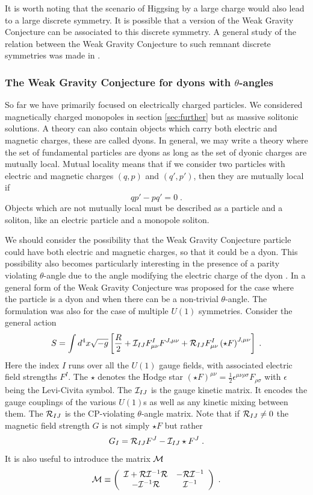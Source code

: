 \documentclass[11pt,a4paper]{article}
\numberwithin{equation}{section}
\numberwithin{table}{section}\setlength{\multlinegap}{25pt}
\newcommand{\be}{\begin{equation}}
\newcommand{\ee}{\end{equation}}
\begin{document}
It is worth noting that the scenario of Higgsing by a large charge would also lead to a large discrete symmetry. It is possible that a version of the Weak Gravity Conjecture can be associated to this discrete symmetry. A general study of the relation between the Weak Gravity Conjecture to such remnant discrete symmetries was made in \cite{Craig:2018yvw}.

\subsubsection{The Weak Gravity Conjecture for dyons with $\theta$-angles}
\label{sec:wgcta}

So far we have primarily focused on electrically charged particles. We considered magnetically charged monopoles in section \ref{sec:further} but as massive solitonic solutions. A theory can also contain objects which carry both electric and magnetic charges, these are called dyons. In general, we may write a theory where the set of fundamental particles are dyons as long as the set of dyonic charges are mutually local. Mutual locality means that if we consider two particles with electric and magnetic charges $\left(q,p\right)$ and $\left(q',p'\right)$, then they are mutually local if
\be
\label{ml}
q p' - p q' = 0 \;.
\ee
Objects which are not mutually local must be described as a particle and a soliton, like an electric particle and a monopole soliton. 

We should consider the possibility that the Weak Gravity Conjecture particle could have both electric and magnetic charges, so that it could be a dyon. This possibility also becomes particularly interesting in the presence of a parity violating $\theta$-angle due to the angle modifying the electric charge of the dyon \cite{WITTEN1979283}. In \cite{Palti:2017elp} a general form of the Weak Gravity Conjecture was proposed for the case where the particle is a dyon and when there can be a non-trivial $\theta$-angle. The formulation was also for the case of multiple $U(1)$ symmetries. Consider the general action
\be
S = \int d^4x \sqrt{-g} \left[ \frac{R}{2} + {\cal I}_{IJ} F_{\mu\nu}^{I} F^{J,\mu\nu} +  {\cal R}_{IJ} F_{\mu\nu}^{I} \left(\star F\right)^{J,\mu\nu} \right] \;.     \label{N2actionEM}
\ee
Here the index $I$ runs over all the $U(1)$ gauge fields, with associated electric field strengths $F^I$. The $\star$ denotes the Hodge star $\left(\star F\right)^{\mu\nu}=\frac12\epsilon^{\mu\nu\rho\sigma}F_{\rho\sigma}$ with $\epsilon$ being the Levi-Civita symbol. The ${\cal I}_{IJ}$ is the gauge kinetic matrix. It encodes the gauge couplings of the various $U(1)$s as well as any kinetic mixing between them. The ${\cal R}_{IJ}$ is the CP-violating $\theta$-angle matrix. Note that if ${\cal R}_{IJ} \neq 0$ the magnetic field strength $G$ is not simply $\star F$ but rather
\be
G_I = {\cal R}_{IJ} F^J  -  {\cal I}_{IJ} \star F^J \;.
\ee 
It is also useful to introduce the matrix ${\cal M}$ 
\be
{\cal M} \equiv \left( \begin{array}{cc} {\cal I} + {\cal R} {\cal I}^{-1} {\cal R}& - {\cal R} {\cal I}^{-1} \\ -{\cal I}^{-1} {\cal R} & {\cal I}^{-1} \end{array} \right) \;. \label{Mdef}
\ee
\end{document}
